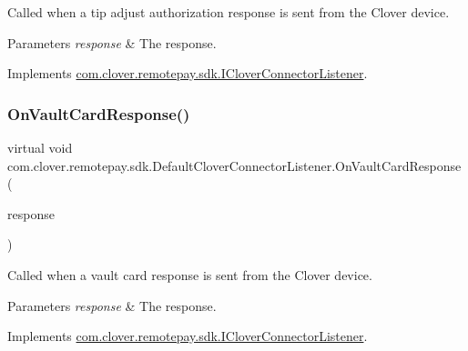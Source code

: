 Called when a tip adjust authorization response is sent from the Clover device. 


\begin{DoxyParams}{Parameters}
{\em response} & The response.\\
\hline
\end{DoxyParams}


Implements \hyperlink{interfacecom_1_1clover_1_1remotepay_1_1sdk_1_1_i_clover_connector_listener_af972cda237b66fcd297117ae195537b7}{com.\+clover.\+remotepay.\+sdk.\+I\+Clover\+Connector\+Listener}.

\mbox{\label{classcom_1_1clover_1_1remotepay_1_1sdk_1_1_default_clover_connector_listener_a99a7cfe7cd6778bc4ec94a06e6f28420}} 
\subsubsection{\texorpdfstring{On\+Vault\+Card\+Response()}{OnVaultCardResponse()}}
{\footnotesize\ttfamily virtual void com.\+clover.\+remotepay.\+sdk.\+Default\+Clover\+Connector\+Listener.\+On\+Vault\+Card\+Response (\begin{DoxyParamCaption}\item[{\hyperlink{classcom_1_1clover_1_1remotepay_1_1sdk_1_1_vault_card_response}{Vault\+Card\+Response}}]{response }\end{DoxyParamCaption})\hspace{0.3cm}{\ttfamily [virtual]}}



Called when a vault card response is sent from the Clover device. 


\begin{DoxyParams}{Parameters}
{\em response} & The response.\\
\hline
\end{DoxyParams}


Implements \hyperlink{interfacecom_1_1clover_1_1remotepay_1_1sdk_1_1_i_clover_connector_listener_a1abb7953534d225a8f6a2e9c43dac34e}{com.\+clover.\+remotepay.\+sdk.\+I\+Clover\+Connector\+Listener}.

